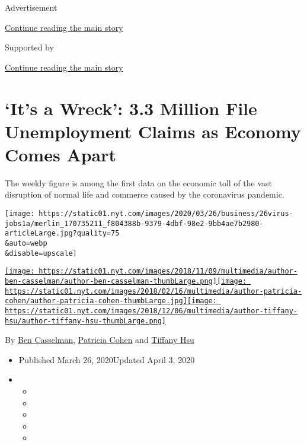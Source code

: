 Advertisement

\protect\hyperlink{after-top}{Continue reading the main story}

Supported by

\protect\hyperlink{after-sponsor}{Continue reading the main story}

\hypertarget{its-a-wreck-33-million-file-unemployment-claims-as-economy-comes-apart}{%
\section{`It's a Wreck': 3.3 Million File Unemployment Claims as Economy
Comes
Apart}\label{its-a-wreck-33-million-file-unemployment-claims-as-economy-comes-apart}}

The weekly figure is among the first data on the economic toll of the
vast disruption of normal life and commerce caused by the coronavirus
pandemic.

\texttt{[image: https://static01.nyt.com/images/2020/03/26/business/26virus-jobs1a/merlin\_170735211\_f804388b-9379-4dbf-98e2-9bb4ae7b2980-articleLarge.jpg?quality=75\\\&auto=webp\\\&disable=upscale]}

\href{https://www.nytimes.com/by/ben-casselman}{\texttt{[image: https://static01.nyt.com/images/2018/11/09/multimedia/author-ben-casselman/author-ben-casselman-thumbLarge.png]}}\href{https://www.nytimes.com/by/patricia-cohen}{\texttt{[image: https://static01.nyt.com/images/2018/02/16/multimedia/author-patricia-cohen/author-patricia-cohen-thumbLarge.jpg]}}\href{https://www.nytimes.com/by/tiffany-hsu}{\texttt{[image: https://static01.nyt.com/images/2018/12/06/multimedia/author-tiffany-hsu/author-tiffany-hsu-thumbLarge.png]}}

By \href{https://www.nytimes.com/by/ben-casselman}{Ben Casselman},
\href{https://www.nytimes.com/by/patricia-cohen}{Patricia Cohen} and
\href{https://www.nytimes.com/by/tiffany-hsu}{Tiffany Hsu}

\begin{itemize}
\item
  Published March 26, 2020Updated April 3, 2020
\item
  \begin{itemize}
  \item
  \item
  \item
  \item
  \item
  \end{itemize}
\end{itemize}


